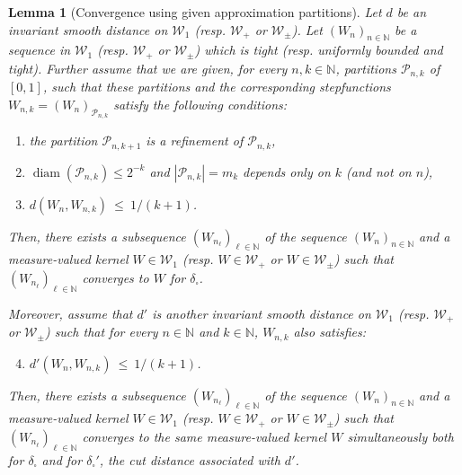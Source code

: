 \documentclass{amsart}
\theoremstyle{plain}
\newtheorem{lemme}[Th]{Lemma}
\theoremstyle{definition}
\newcommand{\signed}{\pm}
\newcommand{\cP}{\mathcal{P}}
\newcommand{\Graphon}{\mathcal{W}_1}
\newcommand{\Kernel}{\mathcal{W}_{\signed}}
\newcommand{\Kernelp}{\mathcal{W}_{+}}
\newcommand{\dd}{\delta_{\square}}
\newcommand{\ddPrime}{\delta_{\square}'}
\newcommand{\dPrime}{d'}
\newcommand{\N}{\mathbb{N}}
\DeclareMathOperator{\diam}{diam}
\begin{document}
\begin{lemme}[Convergence using given approximation partitions]
	\label{lemme_partitions_convergence}
  Let  $d$ be  an invariant  smooth 
  distance  on
  $\Graphon$ (resp. $\Kernelp$ or $\Kernel$).
Let $(W_n )_{n\in\N}$ be a sequence in   $\Graphon$ 
(resp. $\Kernelp$ or $\Kernel$)
which is tight (resp. uniformly bounded and tight). 
Further assume that we are given, for every $n,k\in\N$,
partitions $\mathcal{P}_{n,k}$ of $[0,1]$,
such that these partitions and 
the corresponding stepfunctions $W_{n,k} = (W_n)_{\mathcal{P}_{n,k}}$
satisfy the following conditions:
\begin{enumerate}[label=(\roman*)]
\item \label{prop_Wnk_1} 
the partition $\mathcal{P}_{n,k+1}$ is a refinement of $\mathcal{P}_{n,k}$,
\item \label{prop_Wnk_2} 
$\diam(\cP_{n,k}) \leq 2^{-k}$ and $|\mathcal{P}_{n,k}| = m_k$
	depends only on $k$ (and not on $n$),
\item \label{prop_Wnk_3} 
$d(W_n, W_{n,k}) \ \leq\ 1/(k+1)$.
\end{enumerate}
Then, there exists a subsequence $(W_{n_\ell} )_{\ell\in\N}$ of the sequence $(W_n )_{n\in\N}$
and a measure-valued kernel  $W\in\Graphon$ (resp. $W\in \Kernelp$
or $W\in\Kernel$) such that
$(W_{n_\ell} )_{\ell\in\N}$ converges to $W$ for $\dd$.
\medskip

Moreover, assume that $\dPrime$ is another  invariant  smooth  
  distance  on
    $\Graphon$ (resp. $\Kernelp$ or $\Kernel$) such that  for every $n\in\N$ and
    $k\in \N$, $W_{n,k}$ also satisfies: 
\begin{enumerate}[label=(\roman*)]
\setcounter{enumi}{3}
\item \label{prop_Wnk_4} 
$\dPrime(W_n, W_{n,k}) \ \leq\ 1/(k+1)$.
\end{enumerate}
Then, there exists a subsequence $(W_{n_\ell} )_{\ell\in\N}$ of the sequence $(W_n )_{n\in\N}$
and a measure-valued kernel  $W\in\Graphon$ (resp. $W\in \Kernelp$ or $W\in\Kernel$) such that
$(W_{n_\ell} )_{\ell\in\N}$ converges to the same measure-valued kernel $W$ 
simultaneously both for $\dd$ and for $\ddPrime$, the cut
distance associated with $\dPrime$.
\end{lemme}
\end{document}
